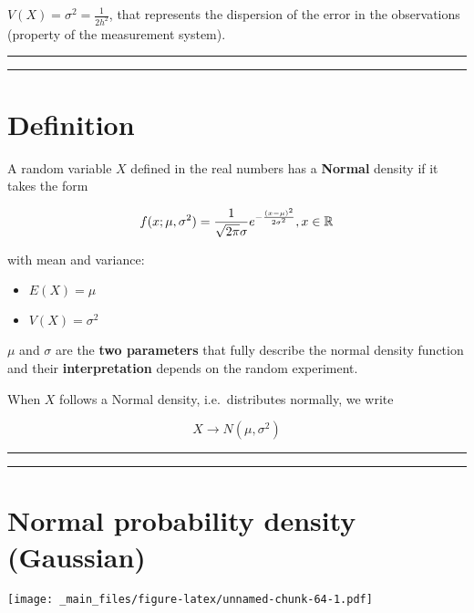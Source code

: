 \documentclass[
]{book}
\providecommand{\tightlist}{%
  \setlength{\itemsep}{0pt}\setlength{\parskip}{0pt}}
\begin{document}
\(V(X)=\sigma^2=\frac{1}{2h^2}\), that represents the dispersion of the error in the observations (property of the measurement system).

\begin{center}\rule{0.5\linewidth}{0.5pt}\end{center}

\begin{center}\rule{0.5\linewidth}{0.5pt}\end{center}

\hypertarget{definition}{%
\section{Definition}\label{definition}}

A random variable \(X\) defined in the real numbers has a \textbf{Normal} density if it takes the form

\[f(x; \mu, \sigma^2)=\frac{1}{\sqrt{2\pi}\sigma}e^{-\frac{(x-\mu)^2}{2\sigma^2}}, x \in {\Bbb R}\]

with mean and variance:

\begin{itemize}
\tightlist
\item
  \(E (X) = \mu\)
\item
  \(V (X) = \sigma^2\)
\end{itemize}

\(\mu\) and \(\sigma\) are the \textbf{two parameters} that fully describe the normal density function and their \textbf{interpretation} depends on the random experiment.

When \(X\) follows a Normal density, i.e.~distributes normally, we write

\[X\rightarrow N(\mu,\sigma^2)\]

\begin{center}\rule{0.5\linewidth}{0.5pt}\end{center}

\begin{center}\rule{0.5\linewidth}{0.5pt}\end{center}

\hypertarget{normal-probability-density-gaussian}{%
\section{Normal probability density (Gaussian)}\label{normal-probability-density-gaussian}}

\texttt{[image: \_main\_files/figure-latex/unnamed-chunk-64-1.pdf]}
\end{document}
